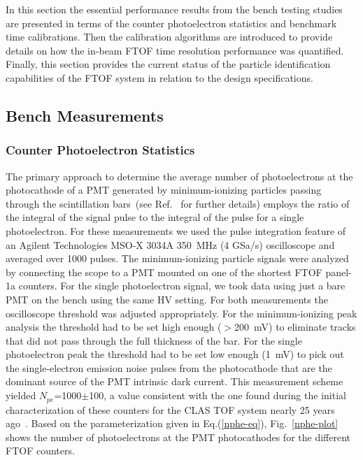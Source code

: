 \documentclass{elsart}
\begin{document}
In this section the essential performance results from the bench testing studies are presented in terms
of the counter photoelectron statistics and benchmark time calibrations. Then the calibration algorithms
are introduced to provide details on how the in-beam FTOF time resolution performance was quantified.
Finally, this section provides the current status of the particle identification capabilities of the FTOF
system in relation to the design specifications.

\subsection{Bench Measurements}

\subsubsection{Counter Photoelectron Statistics}
\label{sec:npe}

The primary approach to determine the average number of photoelectrons at the photocathode of a PMT
generated by minimum-ionizing particles passing through the scintillation bars~(see Ref.~\cite{Gi86} for
further details) employs the ratio of the integral of the signal pulse to the integral of the pulse for a single
photoelectron. For these measurements we used the pulse integration feature of an Agilent Technologies
MSO-X 3034A 350~MHz (4 GSa/s) oscilloscope and averaged over 1000 pulses. The minimum-ionizing
particle signals were analyzed by connecting the scope to a PMT mounted on one of the shortest FTOF
panel-1a counters. For the single photoelectron signal, we took data using just a bare PMT on the bench
using the same HV setting. For both measurements the oscilloscope threshold was adjusted appropriately.
For the minimum-ionizing peak analysis the threshold had to be set high enough ($>$200~mV) to eliminate
tracks that did not pass through the full thickness of the bar. For the single photoelectron peak the
threshold had to be set low enough (1~mV) to pick out the single-electron emission noise pulses from the 
photocathode that are the dominant source of the PMT intrinsic dark current. This measurement scheme
yielded $N_{pe}$=1000$\pm$100, a value consistent with the one found during the initial characterization
of these counters for the CLAS TOF system nearly 25 years ago~\cite{tof-nim}. Based on the
parameterization given in Eq.(\ref{nphe-eq}), Fig.~\ref{nphe-plot} shows the number of photoelectrons at
the PMT photocathodes for the different FTOF counters.
\end{document}
